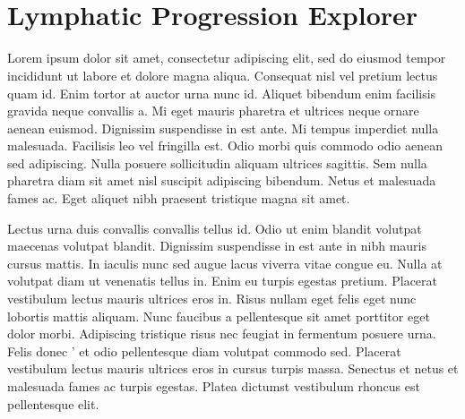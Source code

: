 \documentclass[\relativeRoot/main.tex]{subfiles}
\begin{document}
\chapter[LyProX -- Lymphatic Progression Explorer]{\hspace{0.3mm}\\[0.5ex]\large{Lymphatic Progression Explorer}}

Lorem ipsum dolor sit amet, consectetur adipiscing elit, sed do eiusmod tempor incididunt ut labore et dolore magna aliqua. Consequat nisl vel pretium lectus quam id. Enim tortor at auctor urna nunc id. Aliquet bibendum enim facilisis gravida neque convallis a. Mi eget mauris pharetra et ultrices neque ornare aenean euismod. Dignissim suspendisse in est ante. Mi tempus imperdiet nulla malesuada. Facilisis leo vel fringilla est. Odio morbi quis commodo odio aenean sed adipiscing. Nulla posuere sollicitudin aliquam ultrices sagittis. Sem \inlinelyproxlogo{} nulla pharetra diam sit amet nisl suscipit adipiscing bibendum. Netus et malesuada fames ac. Eget aliquet nibh praesent tristique magna sit amet.

Lectus urna duis convallis convallis tellus id. Odio ut enim blandit volutpat maecenas volutpat blandit. Dignissim suspendisse in est ante in nibh mauris cursus mattis. In iaculis nunc sed augue lacus viverra vitae congue eu. Nulla at volutpat diam ut venenatis tellus in. Enim eu turpis egestas pretium. Placerat vestibulum lectus mauris ultrices eros in. Risus nullam eget felis eget nunc lobortis mattis aliquam. Nunc faucibus a pellentesque sit amet porttitor eget dolor morbi. Adipiscing tristique risus nec feugiat in fermentum posuere urna. Felis donec \inlinelyproxlogo{}' et odio pellentesque diam volutpat commodo sed. Placerat vestibulum lectus mauris ultrices eros in cursus turpis massa. Senectus et netus et malesuada fames ac turpis egestas. Platea dictumst vestibulum rhoncus est pellentesque elit.
\end{document}
